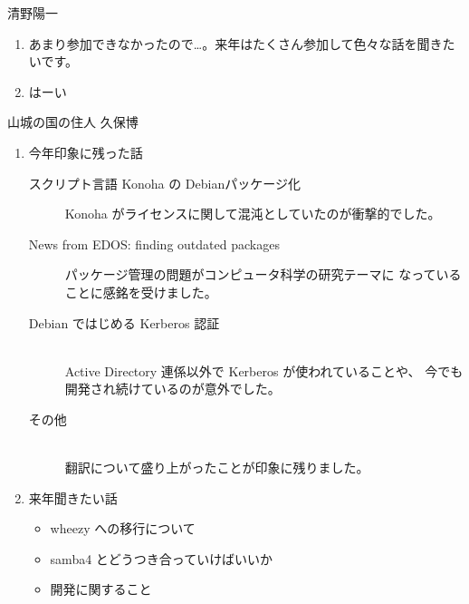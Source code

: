 \documentclass[mingoth,a4paper]{jsarticle}
\begin{document}
\begin{multicols}{2}
\begin{prework}{  清野陽一 }
  \begin{enumerate}
  \item あまり参加できなかったので…。来年はたくさん参加して色々な話を聞きたいです。
  \item はーい
  \end{enumerate}
\end{prework}\vfill

\begin{prework}{ 山城の国の住人 久保博 }
  \begin{enumerate}
  \item 今年印象に残った話
    \begin{description}
    \item[スクリプト言語 Konoha の Debianパッケージ化]\mbox{}
      Konoha がライセンスに関して混沌としていたのが衝撃的でした。
    \item[News from EDOS: finding outdated packages]\mbox{}
      パッケージ管理の問題がコンピュータ科学の研究テーマに
      なっていることに感銘を受けました。
    \item[Debian ではじめる Kerberos 認証]\mbox{}\\
      Active Directory 連係以外で Kerberos が使われていることや、
      今でも開発され続けているのが意外でした。
    \item[その他]\mbox{}\\
      翻訳について盛り上がったことが印象に残りました。
    \end{description}
  \item 来年聞きたい話
    \begin{itemize}
    \item wheezy への移行について
    \item samba4 とどうつき合っていけばいいか
    \item 開発に関すること
    \end{itemize}
\end{enumerate}
\end{prework}\vfill


\end{multicols}

\clearpage

\end{document}
